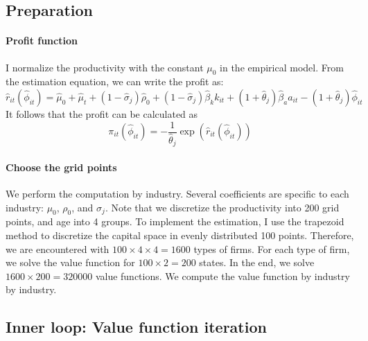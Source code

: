 \subsection{Preparation}
\paragraph{Profit function}

I normalize the productivity with the constant $\mu_{0}$ in the
empirical model. From the estimation equation, we can write the profit
as:
\begin{equation}
\hat{r}_{it}\left(\hat{\phi}_{it}\right)=\hat{\mu}_{0}+\hat{\mu}_{t}+\left(1-\hat{\sigma}_{j}\right)\hat{\rho}_{0}+\left(1-\hat{\sigma}_{j}\right)\hat{\beta}_{k}k_{it}+\left(1+\hat{\theta}_{j}\right)\hat{\beta}_{a}a_{it}-\left(1+\hat{\theta}_{j}\right)\hat{\phi}_{it}
\end{equation}
It follows that the profit can be calculated as 
\begin{equation}
\pi_{it}\left(\hat{\phi}_{it}\right)=-\frac{1}{\hat{\theta}_{j}}\exp\left(\hat{r}_{it}\left(\hat{\phi}_{it}\right)\right)
\end{equation}

\paragraph{Choose the grid points}

We perform the computation by industry. Several coefficients are specific
to each industry: $\mu_{0}$, $\rho_{0}$, and $\sigma_{j}$. Note
that we discretize the productivity into 200 grid points, and age
into 4 groups. To implement the estimation, I use the trapezoid method
to discretize the capital space in evenly distributed 100 points.
Therefore, we are encountered with $100\times4\times4=1600$ types
of firms. For each type of firm, we solve the value function for $100\times2=200$
states. In the end, we solve $1600\times200=320000$ value functions.
We compute the value function by industry by industry. 

\subsection{Inner loop: Value function iteration}

